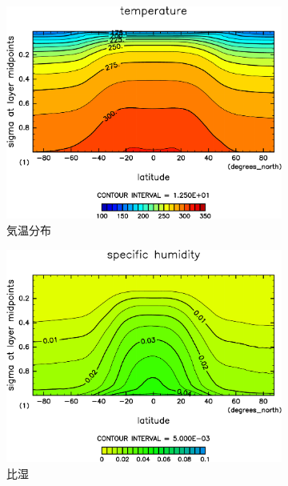 \documentclass[body]{subfiles}
\begin{document}
\begin{figure}[t]
\begin{subfigure}{.4\textwidth}
		\includegraphics[width=\columnwidth]{S1800/Temp,time=3650:4015-crop-rotate.pdf}
		\caption{気温分布}
	\end{subfigure}
	\begin{subfigure}{.4\textwidth}
		\centering
		\includegraphics[width=\columnwidth]{S1800/QH2OVap,time=3650:4015-crop-rotate.pdf}
		\caption{比湿}
	\end{subfigure}
	\begin{subfigure}{.4\textwidth}
		\centering

\end{subfigure}
\end{figure}
\end{document}
